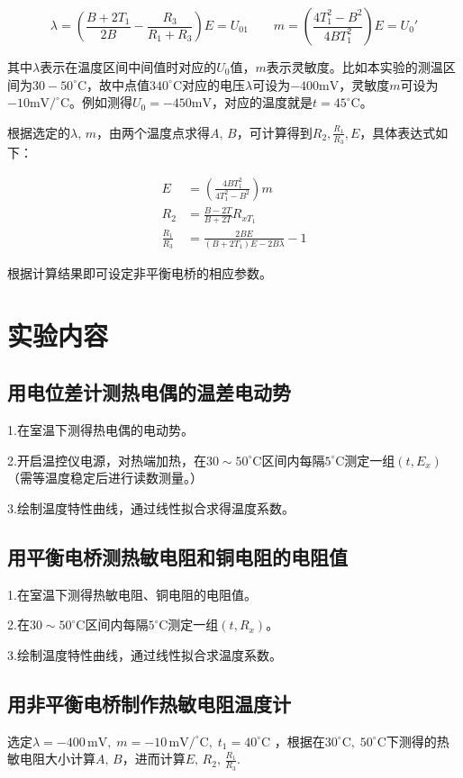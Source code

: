 \documentclass[12pt]{article}
\begin{document}
\[
    \lambda=\left(\frac{B+2T_1}{2B}-\frac{R_3}{R_1+R_3}\right)E=U_{01}\qquad m=\left(\frac{4T_1^2-B^2}{4BT_1^2}\right)E=U_0'
\]

其中$ \lambda $表示在温度区间中间值时对应的$ U_0 $值，$ m $表示灵敏度。比如本实验的测温区间为$30-50^\circ\mathrm{C}$，故中点值$340^\circ\mathrm{C}$对应的电压$\lambda$可设为$-400\mathrm{mV}$，灵敏度$m$可设为$-10\mathrm{mV/^\circ C}$。例如测得$U_0=-450\mathrm{mV}$，对应的温度就是$t=45^\circ\mathrm{C}$。

根据选定的$ \lambda,\,m $，由两个温度点求得$ A,\,B $，可计算得到$ R_2,\frac{R_1}{R_3},E $，具体表达式如下：

\[
    \begin{aligned}
        E&=\left(\frac{4BT_1^2}{4T_1^2-B^2}\right)m \\
        R_2&=\frac{B-2T}{B+2T}R_{xT_1} \\
        \frac{R_1}{R_3}&=\frac{2BE}{(B+2T_1)E-2B\lambda}-1
    \end{aligned}
\]

根据计算结果即可设定非平衡电桥的相应参数。

\section{实验内容}
\subsection{用电位差计测热电偶的温差电动势}
1.在室温下测得热电偶的电动势。

2.开启温控仪电源，对热端加热，在$ 30\sim 50^\circ\mathrm{C}$区间内每隔$5^\circ\mathrm{C}$测定一组$ (t,E_x) $（需等温度稳定后进行读数测量。）

3.绘制温度特性曲线，通过线性拟合求得温度系数。
\subsection{用平衡电桥测热敏电阻和铜电阻的电阻值}
1.在室温下测得热敏电阻、铜电阻的电阻值。

2.在$ 30\sim 50^\circ\mathrm{C}$区间内每隔$5^\circ\mathrm{C}$测定一组$ (t,R_x) $。

3.绘制温度特性曲线，通过线性拟合求温度系数。
\subsection{用非平衡电桥制作热敏电阻温度计}
选定$ \lambda = -400\,\mathrm{mV},\; m=-10\,\mathrm{mV/^\circ C},\; t_1=40^\circ\mathrm{C}$ ，根据在$ 30^\circ\mathrm{C},\;50^\circ\mathrm{C} $下测得的热敏电阻大小计算$ A,\,B $，进而计算$ E,\,R_2,\,\frac{R_1}{R_3} $.
\end{document}
